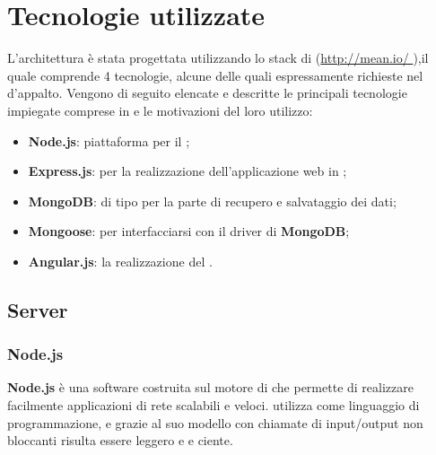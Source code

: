 \section{Tecnologie utilizzate}
L'architettura è stata progettata utilizzando lo stack di \textbf{} (\url {http://mean.io/ } ),il quale comprende 4 tecnologie, alcune delle quali espressamente richieste nel  d’appalto. Vengono di seguito elencate e descritte le principali tecnologie impiegate comprese in \textbf{} e le motivazioni del loro utilizzo:
\begin{itemize}
\item \textbf{Node.js}: piattaforma per il ;
\item \textbf{Express.js}:  per la realizzazione dell’applicazione web in  ;
\item \textbf{MongoDB}:  di tipo  per la parte di recupero e salvataggio dei dati; 
\item \textbf{Mongoose}:  per interfacciarsi con il driver di \textbf{MongoDB};
\item \textbf{Angular.js}:   la realizzazione del  .
\end{itemize}

	\subsection{Server}
	\subsubsection{Node.js}
\textbf{Node.js} è una  software costruita sul motore  di  che permette di realizzare facilmente applicazioni di rete scalabili e veloci.  utilizza  come linguaggio di programmazione, e grazie al suo modello  con chiamate di input/output non bloccanti risulta essere leggero e e ciente.

